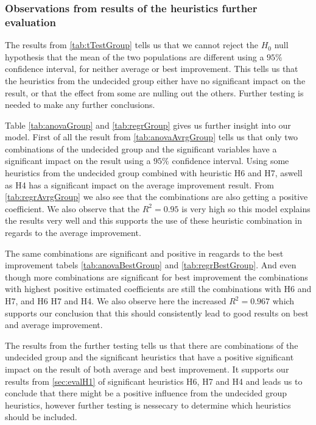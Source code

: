 \documentclass[../main.tex]{subfiles}
\begin{document}
\subsubsection{Observations from results of the heuristics further evaluation}
The results from \cref{tab:tTestGroup} tells us that we cannot reject the $H_0$ null hypothesis  that the mean of the two populations are different using a $95\%$ confidence interval, for neither average or best improvement.
This tells us that the heuristics from the undecided group either have no significant impact on the result, or that the effect from some are nulling out the others. Further testing is needed to make any further conclusions. \par
Table \ref{tab:anovaGroup} and \cref{tab:regrGroup} gives us further insight into our model.
First of all the result from \cref{tab:anovaAvrgGroup} tells us that only two combinations of the undecided group and the significant variables have a significant impact on the result using a $95\%$ confidence interval.
Using some heuristics from the undecided group combined with heuristic H6 and H7, aswell as H4 has a significant impact on the average improvement result.
From \cref{tab:regrAvrgGroup} we also see that the combinations are also getting a positive coefficient.
We also observe that the $R^2 = 0.95$ is very high so this model explains the results very well and this supports the use of these heuristic combination in regards to the average improvement.
\par
The same combinations are significant and positive in reagards to the best improvement tabels \cref{tab:anovaBestGroup} and \cref{tab:regrBestGroup}.
And even though more combinations are significant for best improvement the combinations with highest positive estimated coefficients are still the combinations with H6 and H7, and H6 H7 and H4.
We also observe here the increased $R^2 = 0.967$ which supports our conclusion that this should consistently lead to good results on best and average improvement.
\par
The results from the further testing tells us that there are combinations of the undecided group and the significant heuristics that have a positive significant impact on the result of both average and best improvement. 
It supports our results from \cref{sec:evalH1} of significant heuristics H6, H7 and H4 and leads us to conclude that there might be a positive influence from the undecided group heuristics, however further testing is nessecary to determine which heuristics should be included. 
\end{document}
